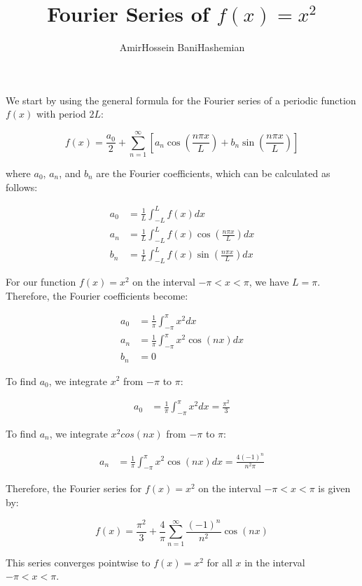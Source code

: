 \documentclass{article}
\begin{document}
  
  \title{Fourier Series of $f(x) = x^2$}
  \author{AmirHossein BaniHashemian}
  
  \maketitle
  
  We start by using the general formula for the Fourier series of a periodic function $f(x)$ with period $2L$:
  
  \begin{equation*}
  f(x) = \frac{a_0}{2} + \sum_{n=1}^{\infty} [a_n \cos(\frac{n\pi x}{L}) + b_n \sin(\frac{n\pi x}{L})]
  \end{equation*}
  
  where $a_0$, $a_n$, and $b_n$ are the Fourier coefficients, which can be calculated as follows:
  
  \begin{align*}
  a_0 &= \frac{1}{L} \int_{-L}^{L} f(x) dx \\
  a_n &= \frac{1}{L} \int_{-L}^{L} f(x) \cos(\frac{n\pi x}{L}) dx \\
  b_n &= \frac{1}{L} \int_{-L}^{L} f(x) \sin(\frac{n\pi x}{L}) dx
  \end{align*}
  
  For our function $f(x) = x^2$ on the interval $-\pi<x<\pi$, we have $L = \pi$. Therefore, the Fourier coefficients become:
  
  \begin{align*}
  a_0 &= \frac{1}{\pi} \int_{-\pi}^{\pi} x^2 dx \\
  a_n &= \frac{1}{\pi} \int_{-\pi}^{\pi} x^2 \cos(nx) dx \\
  b_n &= 0
  \end{align*}
  
  To find $a_0$, we integrate $x^2$ from $-\pi$ to $\pi$:
  
  \begin{align*}
  a_0 &= \frac{1}{\pi} \int_{-\pi}^{\pi} x^2 dx = \frac{\pi^2}{3}
  \end{align*}
  
  To find $a_n$, we integrate $x^2 cos(nx)$ from $-\pi$ to $\pi$:
  
  \begin{align*}
  a_n &= \frac{1}{\pi} \int_{-\pi}^{\pi} x^2 \cos(nx) dx = \frac{4(-1)^n}{n^2\pi}
  \end{align*}
  
  Therefore, the Fourier series for $f(x) = x^2$ on the interval $-\pi<x<\pi$ is given by:
  
  \begin{equation*}
  f(x) = \frac{\pi^2}{3} + \frac{4}{\pi} \sum_{n=1}^{\infty} \frac{(-1)^n}{n^2} \cos(nx)
  \end{equation*}
  
  This series converges pointwise to $f(x) = x^2$ for all $x$ in the interval $-\pi<x<\pi$.
  
  
\end{document}
